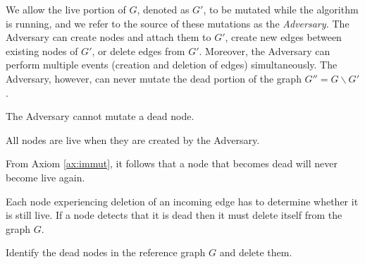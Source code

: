 We allow the live portion
of $G$, denoted as $G'$, to be mutated while the algorithm is running, and we refer
to the source of these mutations as the {\em Adversary.}
The Adversary can create nodes and attach them to $G'$, create new edges between existing nodes of $G'$, or delete edges from $G'$. Moreover, the Adversary can perform multiple events (creation and deletion of edges)
simultaneously. The Adversary, however, can never mutate the dead portion of the graph $G'' = G\backslash G'$.

\begin{axiom}
	The Adversary cannot mutate a dead node.
	\label{ax:immut}
\end{axiom}

\begin{axiom}
	All nodes are live when they are created by the Adversary.
\end{axiom}

From Axiom \ref{ax:immut}, it follows that a node that becomes dead will never
become live again.

Each node experiencing deletion of an incoming edge has to determine whether it is still
live. If a node detects that it is dead then it must delete itself from the
graph $G$. %

\begin{definition}
	Identify the dead nodes in the reference graph $G$ and delete them.
\end{definition}

